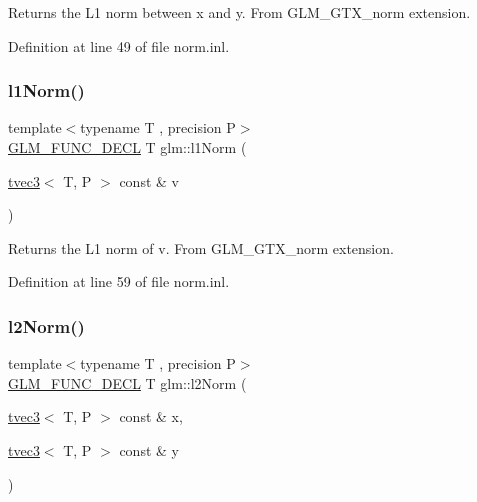Returns the L1 norm between x and y. From G\+L\+M\+\_\+\+G\+T\+X\+\_\+norm extension. 

Definition at line 49 of file norm.\+inl.

\mbox{\label{group__gtx__norm_ga6d5964f09cdb43803496a5ee3ced71cb}} 
\subsubsection{\texorpdfstring{l1Norm()}{l1Norm()}\hspace{0.1cm}{\footnotesize\ttfamily [2/2]}}
{\footnotesize\ttfamily template$<$typename T , precision P$>$ \\
\mbox{\hyperlink{setup_8hpp_ab2d052de21a70539923e9bcbf6e83a51}{G\+L\+M\+\_\+\+F\+U\+N\+C\+\_\+\+D\+E\+CL}} T glm\+::l1\+Norm (\begin{DoxyParamCaption}\item[{\mbox{\hyperlink{structglm_1_1tvec3}{tvec3}}$<$ T, P $>$ const \&}]{v }\end{DoxyParamCaption})}

Returns the L1 norm of v. From G\+L\+M\+\_\+\+G\+T\+X\+\_\+norm extension. 

Definition at line 59 of file norm.\+inl.

\mbox{\label{group__gtx__norm_gafa6fbbc99cd44d81bf030e74eaf7ad64}} 
\subsubsection{\texorpdfstring{l2Norm()}{l2Norm()}\hspace{0.1cm}{\footnotesize\ttfamily [1/2]}}
{\footnotesize\ttfamily template$<$typename T , precision P$>$ \\
\mbox{\hyperlink{setup_8hpp_ab2d052de21a70539923e9bcbf6e83a51}{G\+L\+M\+\_\+\+F\+U\+N\+C\+\_\+\+D\+E\+CL}} T glm\+::l2\+Norm (\begin{DoxyParamCaption}\item[{\mbox{\hyperlink{structglm_1_1tvec3}{tvec3}}$<$ T, P $>$ const \&}]{x,  }\item[{\mbox{\hyperlink{structglm_1_1tvec3}{tvec3}}$<$ T, P $>$ const \&}]{y }\end{DoxyParamCaption})}

